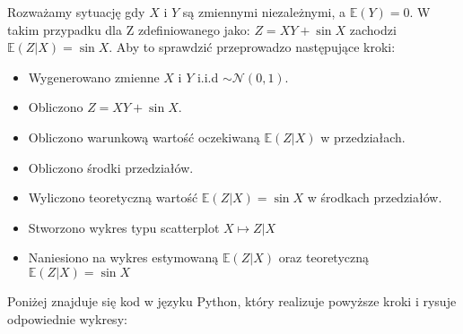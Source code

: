 \documentclass[12pt,letterpaper]{article}
\theoremstyle{definition}
\begin{document}
Rozważamy sytuację gdy \( X \) i \( Y \) są zmiennymi niezależnymi, a \( \mathbb{E}(Y) = 0 \). W takim przypadku dla Z zdefiniowanego jako: \( Z = XY + \sin X \) zachodzi \( \mathbb{E}(Z | X) = \sin X \). Aby to sprawdzić przeprowadzo następujące kroki:
\begin{itemize}
    \item Wygenerowano zmienne \( X \) i \( Y \) i.i.d \( \sim \mathcal{N}(0,1) \).
    \item Obliczono \( Z = XY + \sin X \).
    \item Obliczono warunkową wartość oczekiwaną $\mathbb{E}(Z | X)$ w przedziałach.
    \item Obliczono środki przedziałów.
    \item Wyliczono teoretyczną wartość \( \mathbb{E}(Z | X) = \sin X \) w środkach przedziałów.
    \item Stworzono wykres typu scatterplot \( X \mapsto Z|X \)
    \item Naniesiono na wykres estymowaną $\mathbb{E}(Z | X)$ oraz teoretyczną \( \mathbb{E}(Z | X) = \sin X \) 
\end{itemize}
Poniżej znajduje się kod w języku Python, który realizuje powyższe kroki i rysuje odpowiednie wykresy:
\end{document}
